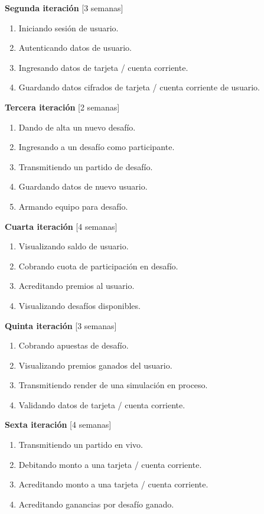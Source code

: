 \documentclass[a4paper, 10pt, twoside]{article}
\begin{document}
\textbf{Segunda iteración} [3 semanas]
\begin{enumerate}
\item Iniciando sesión de usuario.
\item Autenticando datos de usuario.
\item Ingresando datos de tarjeta / cuenta corriente.
\item Guardando datos cifrados de tarjeta / cuenta corriente de usuario.
\end{enumerate}

\textbf{Tercera iteración} [2 semanas]
\begin{enumerate}
\item Dando de alta un nuevo desafío.
\item Ingresando a un desafío como participante.
\item Transmitiendo un partido de desafío.
\item Guardando datos de nuevo usuario.
\item Armando equipo para desafío.
\end{enumerate}

\textbf{Cuarta iteración} [4 semanas]
\begin{enumerate}
\item Visualizando saldo de usuario.
\item Cobrando cuota de participación en desafío.
\item Acreditando premios al usuario.
\item Visualizando desafíos disponibles.
\end{enumerate}

\textbf{Quinta iteración} [3 semanas]
\begin{enumerate}
\item Cobrando apuestas de desafío.
\item Visualizando premios ganados del usuario.
\item Transmitiendo render de una simulación en proceso.
\item Validando datos de tarjeta / cuenta corriente.
\end{enumerate}

\textbf{Sexta iteración} [4 semanas]
\begin{enumerate}
\item Transmitiendo un partido en vivo.
\item Debitando monto a una tarjeta / cuenta corriente.
\item Acreditando monto a una tarjeta / cuenta corriente.
\item Acreditando ganancias por desafío ganado.
\end{enumerate}
\end{document}
